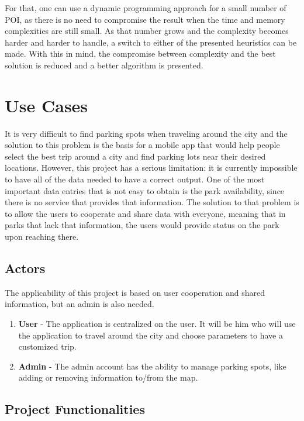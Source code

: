 \documentclass[a4paper, 12pt]{report}
\begin{document}
    For that, one can use a dynamic programming approach for a small number of POI, as there is no need to compromise the result when the time and memory complexities are still small. As that number grows and the complexity becomes harder and harder to handle, a switch to either of the presented heuristics can be made. With this in mind, the compromise between complexity and the best solution is reduced and a better algorithm is presented.
    
    \chapter{Use Cases} \label{application}
     
    It is very difficult to find parking spots when traveling around the city and the solution to this problem is the basis for a mobile app that would help people select the best trip around a city and find parking lots near their desired locations. However, this project has a serious limitation: it is currently impossible to have all of the data needed to have a correct output. One of the most important data entries that is not easy to obtain is the park availability, since there is no service that provides that information. The solution to that problem is to allow the users to cooperate and share data with everyone, meaning that in parks that lack that information, the users would provide status on the park upon reaching there.
    
    \section{Actors}
    
    The applicability of this project is based on user cooperation and shared information, but an admin is also needed.
        
    \begin{enumerate}
        \item \textbf{User} - The application is centralized on the user. It will be him who will use the application to travel around the city and choose parameters to have a customized trip.
        \item \textbf{Admin} - The admin account has the ability to manage parking spots, like adding or removing information to/from the map. 
    \end{enumerate}
    
    \section{Project Functionalities}
    
\end{document}
